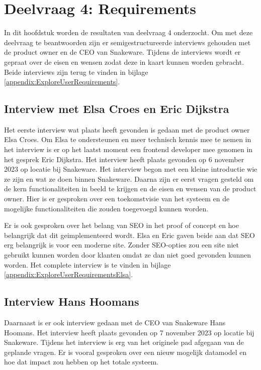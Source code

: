 \section{Deelvraag 4: Requirements}
\label{sec:Requirements}
In dit hoofdstuk worden de resultaten van deelvraag 4 \textit{\SubquestionFour} onderzocht.
Om met deze deelvraag te beantwoorden zijn er semigestructureerde interviews gehouden met de product owner en de CEO van Snakeware.
Tijdens de interviews wordt er gepraat over de eisen en wensen zodat deze in kaart kunnen worden gebracht.
Beide interviews zijn terug te vinden in bijlage \ref{appendix:ExploreUserRequirements}.

\subsection{Interview met Elsa Croes en Eric Dijkstra}
Het eerste interview wat plaats heeft gevonden is gedaan met de product owner Elsa Croes.
Om Elsa te ondersteunen en meer technisch kennis mee te nemen in het interview is er op het laatst moment een frontend developer mee genomen in het gesprek Eric Dijkstra.
Het interview heeft plaats gevonden op 6 november 2023 op locatie bij Snakeware.
Het interview begon met een kleine introductie wie ze zijn en wat ze doen binnen Snakeware.
Daarna zijn er eerst vragen gesteld om de kern functionaliteiten in beeld te krijgen en de eisen en wensen van de product owner.
Hier is er gesproken over een toekomstvisie van het systeem en de mogelijke functionaliteiten die zouden toegevoegd kunnen worden.

\whitespace
Er is ook gesproken over het belang van SEO in het proof of concept en hoe belangrijk dat dit geimplementeerd wordt.
Elsa en Eric gaven beide aan dat SEO erg belangrijk is voor een moderne site.
Zonder SEO-opties zou een site niet gebruikt kunnen worden door klanten omdat ze dan niet goed gevonden kunnen worden.
Het complete interview is te vinden in bijlage \ref{appendix:ExploreUserRequirementsElsa}.

\subsection{Interview Hans Hoomans}
Daarnaast is er ook interview gedaan met de CEO van Snakeware Hans Hoomans.
Het interview heeft plaats gevonden op 7 november 2023 op locatie bij Snakeware.
Tijdens het interview is erg van het originele pad afgegaan van de geplande vragen.
Er is vooral gesproken over een nieuw mogelijk datamodel en hoe dat impact zou hebben op het totale systeem.

